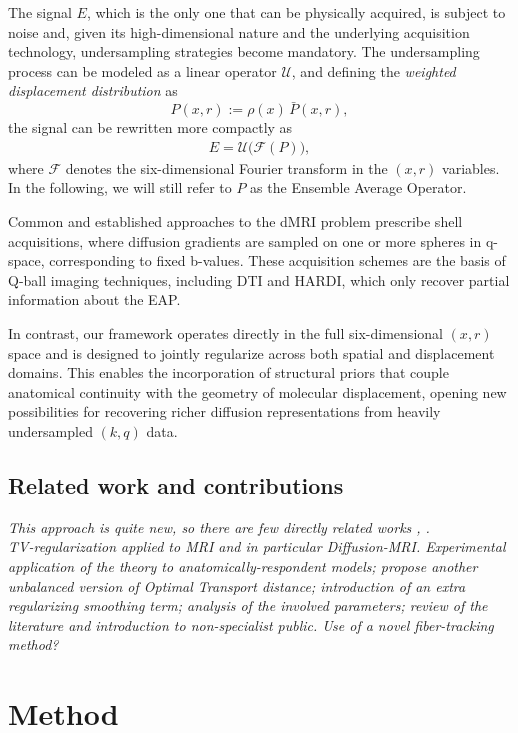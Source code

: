 \documentclass[journal,twoside,web]{ieeecolor}
\begin{document}
The signal $E$, which is the only one that can be physically acquired, is subject to noise and, given its high-dimensional nature and the underlying acquisition technology, undersampling strategies become mandatory. The undersampling process can be modeled as a linear operator $\mathcal{U}$, and defining the \emph{weighted displacement distribution} as
\[
P(x,r) := \rho(x) \, \bar{P}(x,r),
\]
the signal can be rewritten more compactly as
\begin{align}\label{eq:EAP Fourier}
    E = \mathcal{U(F}(P)),
\end{align}
where \( \mathcal{F} \) denotes the six-dimensional Fourier transform in the \((x, r)\) variables. In the following, we will still refer to $P$ as the Ensemble Average Operator.

Common and established approaches to the dMRI problem prescribe shell acquisitions, where diffusion gradients are sampled on one or more spheres in q-space, corresponding to fixed b-values. These acquisition schemes are the basis of Q-ball imaging techniques, including DTI and HARDI, which only recover partial information about the EAP.

In contrast, our framework operates directly in the full six-dimensional $(x,r)$ space and is designed to jointly regularize across both spatial and displacement domains. This enables the incorporation of structural priors that couple anatomical continuity with the geometry of molecular displacement, opening new possibilities for recovering richer diffusion representations from heavily undersampled $(k,q)$ data.

\subsection{Related work and contributions}
\textit{This approach is quite new, so there are few directly related works \cite{VogtLellmann1}, .\\
TV-regularization applied to MRI and in particular Diffusion-MRI.
Experimental application of the theory to anatomically-respondent models; propose another unbalanced version of Optimal Transport distance; introduction of an extra regularizing smoothing term; analysis of the involved parameters; review of the literature and introduction to non-specialist public. Use of a novel fiber-tracking method?}

\section{Method}
\end{document}
